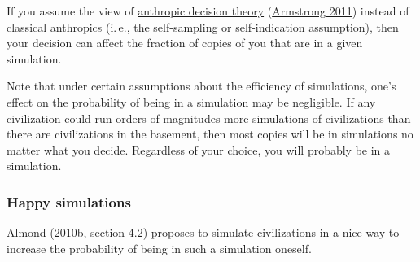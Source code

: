 If you assume the view of
\href{https://www.youtube.com/watch?v=aiGOGkBiWEo}{anthropic
decision theory}
(\href{https://arxiv.org/abs/1110.6437}{Armstrong 2011}) instead
of classical anthropics (i.\,e., the
\href{https://en.wikipedia.org/wiki/Self-sampling_assumption}{self-sampling}
or
\href{https://en.wikipedia.org/wiki/Self-indication_assumption}{self-indication}
assumption), then your decision can affect the fraction of copies of you
that are in a given simulation.

Note that under certain assumptions about the efficiency of simulations,
one's effect on the probability of being in a simulation may be
negligible. If any civilization could run orders of magnitudes more
simulations of civilizations than there are civilizations in the
basement, then most copies will be in simulations no matter what you
decide. Regardless of your choice, you will probably be in a simulation.

\subsubsection{Happy simulations}\label{happy-simulations}

Almond
(\href{https://web.archive.org/web/20120310010225/http://www.paul-almond.com/Correlation2.pdf}{2010b},
section 4.2) proposes to simulate civilizations in a nice way to
increase the probability of being in such a simulation oneself.

